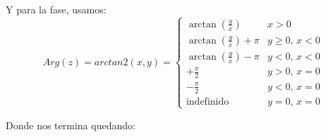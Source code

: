 \documentclass[a4paper,12pt]{report}
\begin{document}
\begin{enumerate}[label=\alph*), left=0pt]
    Y para la fase, usamos:
    \begin{equation}
      \label{fase}
      Arg(z) = arctan2(x, y) = 
      \begin{cases}
        \arctan\left(\frac{y}{x}\right) & x > 0 \\
        \arctan\left(\frac{y}{x}\right) + \pi & y \geq 0, \, x < 0 \\
        \arctan\left(\frac{y}{x}\right) - \pi & y < 0, \, x < 0 \\
        +\frac{\pi}{2} & y > 0, \, x = 0 \\
        -\frac{\pi}{2} & y < 0, \, x = 0 \\
        \text{indefinido} & y = 0, \, x = 0
      \end{cases}
    \end{equation}

    Donde nos termina quedando:


\end{enumerate}
\end{document}

